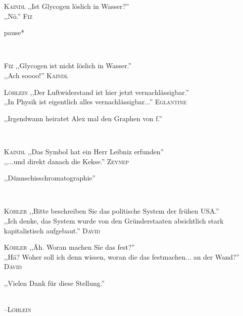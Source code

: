 \vspace{3mm}
\hangindent=0.7cm
\raggedright \textsc{\footnotesize Kaindl} ,,Ist Glycogen löslich in Wasser?''\\
\raggedleft ,,Nö.'' \textsc{\footnotesize Fiz}\\
{\raggedright *pause*}\\
\hangindent=0.7cm
\raggedright \textsc{\footnotesize Fiz} ,,Glycogen ist nicht löslich in Wasser.''\\
\raggedleft ,,Ach soooo!'' \textsc{\footnotesize Kaindl}\\

\vspace{3mm}
\hangindent=0.7cm
\raggedright \textsc{\footnotesize Löhlein} ,,Der Luftwiderstand ist hier jetzt vernachlässigbar.''\\
\raggedleft ,,In Physik ist eigentlich alles vernachlässigbar...'' \textsc{\footnotesize Eglantine}\\

\vspace{3mm}
{\raggedright ,,Irgendwann heiratet Alex mal den Graphen von f.''}\\

\vspace{3mm}
\hangindent=0.7cm
\raggedright \textsc{\footnotesize Kaindl} ,,Das Symbol hat ein Herr Leibniz erfunden''\\
\raggedleft ,,...und direkt danach die Kekse.'' \textsc{\footnotesize Zeynep}\\

\vspace{3mm}
{\raggedright ,,Dünnschisschromatographie''}\\

\vspace{3mm}
\hangindent=0.7cm
\raggedright \textsc{\footnotesize Köhler} ,,Bitte beschreiben Sie das politische System der frühen USA.''\\
\raggedleft ,,Ich denke, das System wurde von den Gründerstaaten absichtlich stark kapitalistisch aufgebaut.'' \textsc{\footnotesize David}\\
\hangindent=0.7cm
\raggedright \textsc{\footnotesize Köhler} ,,Äh. Woran machen Sie das fest?''\\
\raggedleft ,,Hä? Woher soll ich denn wissen, woran die das festmachen... an der Wand?'' \textsc{\footnotesize David}\\

\vspace{3mm}
{\raggedright ,,Vielen Dank für diese Stellung.''}\\
\raggedleft \textsc{\footnotesize --\/Löhlein}\\

